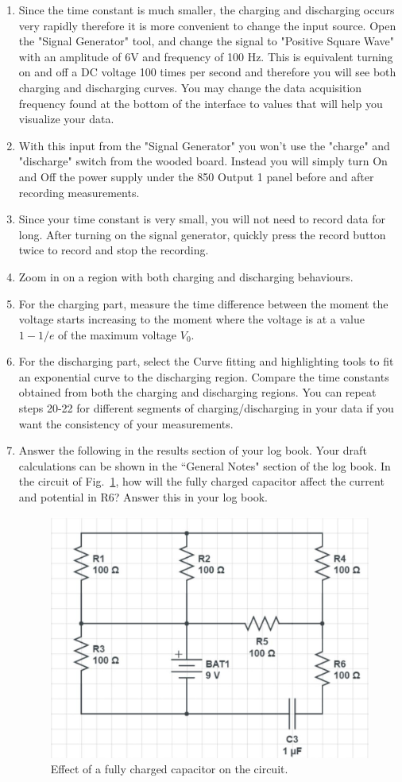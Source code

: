 \documentclass[12pt]{report}
\begin{document}
\begin{enumerate}
\item Since the time constant is much smaller, the charging and discharging occurs very rapidly therefore it is more convenient to change the input source. Open the "Signal Generator" tool, and change the signal to "Positive Square Wave" with an amplitude of 6V and frequency of 100 Hz. This is equivalent turning on and off a DC voltage 100 times per second and therefore you will see both charging and discharging curves. You may change the data acquisition frequency found at the bottom of the interface to values that will help you visualize your data.
\item With this input from the "Signal Generator" you won't use the "charge" and "discharge" switch from the wooded board. Instead you will simply turn On and Off the power supply under the 850 Output 1 panel before and after recording measurements.
\item Since your time constant is very small, you will not need to record data for long. After turning on the signal generator, quickly press the record button twice to record and stop the recording.
\item Zoom in on a region with both charging and discharging behaviours.
\item For the charging part, measure the time difference between the moment the voltage starts increasing to the moment where the voltage is at a value $1-1/e$ of the maximum voltage $V_0$.
\item For the discharging part, select the Curve fitting and highlighting tools to fit an exponential curve to the discharging region. Compare the time constants obtained from both the charging and discharging regions. You can repeat steps 20-22 for different segments of charging/discharging in your data if you want the consistency of your measurements.
\item Answer the following in the results section of your log book. Your draft calculations can be shown in the ``General Notes" section of the log book. In the circuit of Fig.~\ref{Fig:lab2-session1-Rpractice}, how will the fully charged capacitor affect the current and potential in R6? Answer this in your log book.
\begin{figure}[h]
\centering
\includegraphics[width=0.6\linewidth]{lab2-session1-Rpractice}
\caption{Effect of a fully charged capacitor on the circuit.}
\label{Fig:lab2-session1-Rpractice}
\end{figure}


\end{enumerate}
\end{document}
